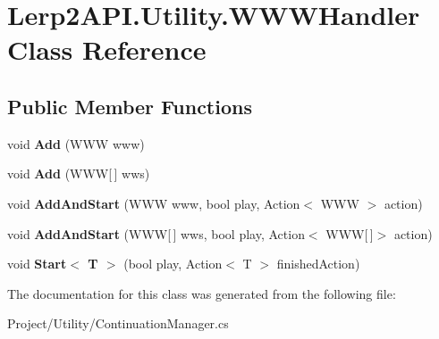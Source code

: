 \hypertarget{class_lerp2_a_p_i_1_1_utility_1_1_w_w_w_handler}{}\section{Lerp2\+A\+P\+I.\+Utility.\+W\+W\+W\+Handler Class Reference}
\label{class_lerp2_a_p_i_1_1_utility_1_1_w_w_w_handler}
\subsection*{Public Member Functions}
\begin{DoxyCompactItemize}
\item 
\mbox{\label{class_lerp2_a_p_i_1_1_utility_1_1_w_w_w_handler_a36d2ece3a21c9632bc8c7ff5973fb44e}} 
void {\bfseries Add} (W\+WW www)
\item 
\mbox{\label{class_lerp2_a_p_i_1_1_utility_1_1_w_w_w_handler_adf39ab8531dd99efb01d138851377207}} 
void {\bfseries Add} (W\+WW\mbox{[}$\,$\mbox{]} wws)
\item 
\mbox{\label{class_lerp2_a_p_i_1_1_utility_1_1_w_w_w_handler_a6d0e43c73aecad2c445599fb114c3b07}} 
void {\bfseries Add\+And\+Start} (W\+WW www, bool play, Action$<$ W\+WW $>$ action)
\item 
\mbox{\label{class_lerp2_a_p_i_1_1_utility_1_1_w_w_w_handler_a9c2f1541be109cf24e15eb593c4446b3}} 
void {\bfseries Add\+And\+Start} (W\+WW\mbox{[}$\,$\mbox{]} wws, bool play, Action$<$ W\+WW\mbox{[}$\,$\mbox{]}$>$ action)
\item 
\mbox{\label{class_lerp2_a_p_i_1_1_utility_1_1_w_w_w_handler_a8b2930d0e2063175945f581429ff1a1f}} 
void {\bfseries Start$<$ T $>$} (bool play, Action$<$ T $>$ finished\+Action)
\end{DoxyCompactItemize}


The documentation for this class was generated from the following file\+:\begin{DoxyCompactItemize}
\item 
Project/\+Utility/Continuation\+Manager.\+cs\end{DoxyCompactItemize}
